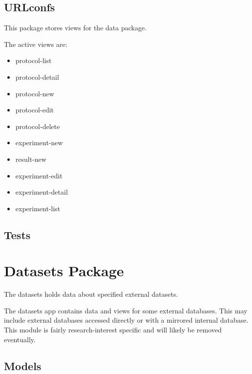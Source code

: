 \documentclass[letterpaper,10pt,english]{sphinxmanual}
\begin{document}
\subsection{URLconfs}
\label{api:urlconfs}\label{api:module-experimentdb.data.urls}
This package stores views for the data package.

The active views are:
\begin{itemize}
\item {} 
protocol-list

\item {} 
protocol-detail

\item {} 
protocol-new

\item {} 
protocol-edit

\item {} 
protocol-delete

\item {} 
experiment-new

\item {} 
result-new

\item {} 
experiment-edit

\item {} 
experiment-detail

\item {} 
experiment-list

\end{itemize}


\subsection{Tests}
\label{api:tests}

\section{Datasets Package}
\label{api:datasets-package}\label{api:module-experimentdb.datasets}
The datasets holds data about specified external datasets.

The datasets app contains data and views for some external databases.  This may include external databases accessed directly or with a mirrored internal database.  This module is fairly research-interest specific and will likely be removed eventually.


\subsection{Models}
\label{api:id1}\label{api:module-experimentdb.datasets.models}
\end{document}
